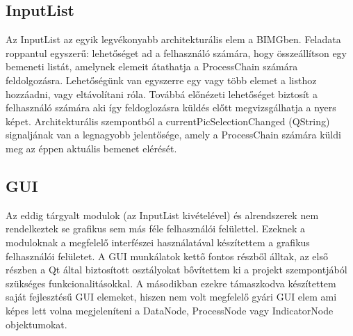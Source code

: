 \documentclass[a4paper,12pt,oneside]{report}
\begin{document}
\subsection{InputList}
Az InputList az egyik legvékonyabb architekturális elem a BIMGben. Feladata roppantul egyszerű: lehetőséget ad a felhasználó számára, hogy összeállítson egy bemeneti listát, amelynek elemeit átathatja a ProcessChain számára feldolgozásra. Lehetőségünk van egyszerre egy vagy több elemet a listhoz hozzáadni, vagy eltávolítani róla. Továbbá előnézeti lehetőséget biztosít a felhasználó számára aki így feldoglozásra küldés előtt megvizsgálhatja a nyers képet. Architekturális szempontból a currentPicSelectionChanged (QString) signaljának van a legnagyobb jelentősége, amely a ProcessChain számára küldi meg az éppen aktuális bemenet elérését.

\subsection{GUI}
Az eddig tárgyalt modulok (az InputList kivételével) és alrendszerek nem rendelkeztek se grafikus sem más féle felhasználói felülettel. Ezeknek a moduloknak a megfelelő interfészei használatával készítettem a grafikus felhasználói felületet. A GUI munkálatok kettő fontos részből álltak, az első részben a Qt által biztosított osztályokat bővítettem ki a projekt szempontjából szükséges funkcionalitásokkal. A másodikban ezekre támaszkodva készítettem saját fejlesztésű GUI elemeket, hiszen nem volt megfelelő gyári GUI elem ami képes lett volna megjeleníteni a DataNode, ProcessNode vagy IndicatorNode objektumokat.
\end{document}
